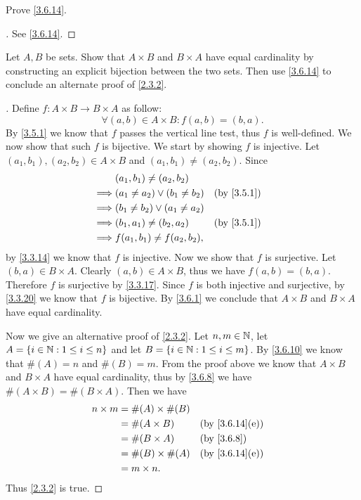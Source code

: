 \begin{ex}\label{ex:3.6.4}
	Prove \cref{3.6.14}.
\end{ex}

\begin{proof}[]
	See \cref{3.6.14}.
\end{proof}

\begin{ex}\label{ex:3.6.5}
	Let \(A, B\) be sets.
	Show that \(A \times B\) and \(B \times A\) have equal cardinality by constructing an explicit bijection between the two sets.
	Then use \cref{3.6.14} to conclude an alternate proof of \cref{2.3.2}.
\end{ex}

\begin{proof}[]
	Define \(f : A \times B \to B \times A\) as follow:
	\[
		\forall (a, b) \in A \times B : f(a, b) = (b, a).
	\]
	By \cref{3.5.1} we know that \(f\) passes the vertical line test, thus \(f\) is well-defined.
	We now show that such \(f\) is bijective.
	We start by showing \(f\) is injective.
	Let \((a_1, b_1), (a_2, b_2) \in A \times B\) and \((a_1, b_1) \neq (a_2, b_2)\).
	Since
	\begin{align*}
		         & (a_1, b_1) \neq (a_2, b_2)                         \\
		\implies & (a_1 \neq a_2) \lor (b_1 \neq b_2) &  & \by{3.5.1} \\
		\implies & (b_1 \neq b_2) \lor (a_1 \neq a_2)                 \\
		\implies & (b_1, a_1) \neq (b_2, a_2)         &  & \by{3.5.1} \\
		\implies & f(a_1, b_1) \neq f(a_2, b_2),
	\end{align*}
	by \cref{3.3.14} we know that \(f\) is injective.
	Now we show that \(f\) is surjective.
	Let \((b, a) \in B \times A\).
	Clearly \((a, b) \in A \times B\), thus we have \(f(a, b) = (b, a)\).
	Therefore \(f\) is surjective by \cref{3.3.17}.
	Since \(f\) is both injective and surjective, by \cref{3.3.20} we know that \(f\) is bijective.
	By \cref{3.6.1} we conclude that \(A \times B\) and \(B \times A\) have equal cardinality.

	Now we give an alternative proof of \cref{2.3.2}.
	Let \(n, m \in \mathbb{N}\), let \(A = \left\lbrace i \in \mathbb{N} : 1 \leq i \leq n\right\rbrace\) and let \(B = \left\lbrace i \in \mathbb{N} : 1 \leq i \leq m\right\rbrace\).
	By \cref{3.6.10} we know that \(\#(A) = n\) and \(\#(B) = m\).
	From the proof above we know that \(A \times B\) and \(B \times A\) have equal cardinality, thus by \cref{3.6.8} we have \(\#(A \times B) = \#(B \times A)\).
	Then we have
	\begin{align*}
		n \times m & = \#(A) \times \#(B)                     \\
		           & = \#(A \times B)     &  & \by{3.6.14}[e] \\
		           & = \#(B \times A)     &  & \by{3.6.8}     \\
		           & = \#(B) \times \#(A) &  & \by{3.6.14}[e] \\
		           & = m \times n.
	\end{align*}
	Thus \cref{2.3.2} is true.
\end{proof}

